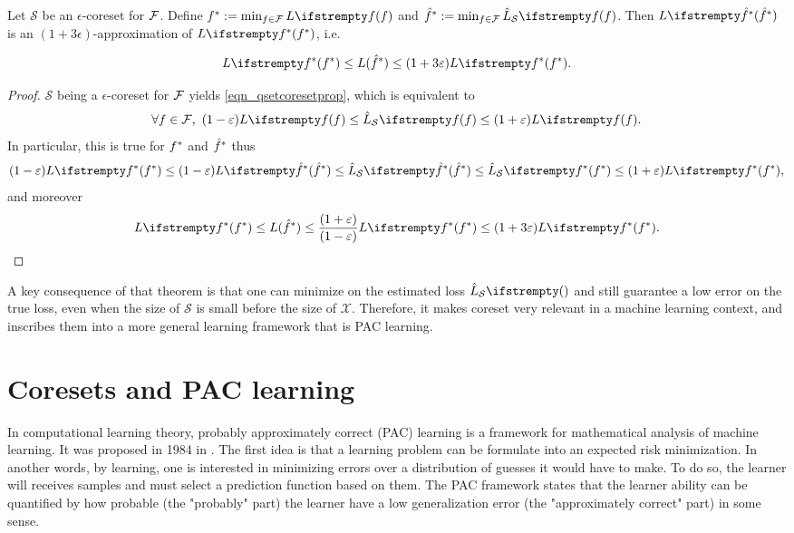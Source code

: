 \begin{tcolorbox}
    \begin{theorem}
        \label{thm_optcoreset}
        Let $\mathcal{S}$ be an $\epsilon$-coreset for $\mathcal{F}$. Define $\query^*:=\min_{\query \in \qset}\loss{\query}$ and $\hat \query^*:=\min_{\query \in \qset}\estloss{\mathcal{S}}{\query}$. Then $\loss{\hat\query^*} $ is an $(1+3\epsilon)$-approximation of $\loss{\query^*}$, i.e.
    
        \begin{equation*}
            \loss{\query^*} \le {L}( \hat\query^*)\leq (1+ 3 \epsilon)\loss{\query^*}.
        \end{equation*}
    \end{theorem}
\end{tcolorbox}
\begin{proof}
    $\mathcal{S}$ being a $\epsilon$-coreset for $\mathcal{F}$ yields \cref{eqn_qsetcoresetprop}, which is equivalent to 
    \begin{equation*}
        \forall \query \in \qset ,\ (1-\epsilon) \loss{\query} \le \estloss{\mathcal{S}}{\query} \le(1+\epsilon) \loss{\query}.
    \end{equation*}
    In particular, this is true for $f^*$ and $\hat {f}^*$ thus
    \begin{equation}
        (1-\epsilon) \loss{\query^*} \le(1-\epsilon) \loss{\hat\query^*} \le \estloss{\mathcal{S}}{\hat\query^*} \le \estloss{\mathcal{S}}{\query^*} \le(1+\epsilon) \loss{\query^*},
    \end{equation}
    and moreover
    \begin{equation*}
        \loss{\query^*} \le {L}( \hat\query^*) \le \frac{(1+\epsilon)}{(1-\epsilon) } \loss{\query^*} \leq (1+ 3 \epsilon)\loss{\query^*}.
        \end{equation*}
\end{proof}
A key consequence of that theorem is that one can minimize on the estimated loss $\estloss{\mathcal{S}}{}$ and still guarantee a low error on the true loss, even when the size of $\mathcal{S}$ is small before the size of $\mathcal{X}$. Therefore, it makes coreset very relevant in a machine learning context, and  inscribes them into a more general learning framework that is PAC learning.

\section{Coresets and PAC learning}
In computational learning theory, probably approximately correct (PAC) learning is a framework for mathematical analysis of machine learning. It was proposed in 1984 in \cite{valiant1984learnable}. The first idea is that a learning problem can be formulate into an expected risk minimization. In another words, by learning, one is interested in minimizing errors over a distribution of guesses it would have to make. To do so, the learner will receives samples and must select a prediction function based on them. The PAC framework states that the learner ability can be quantified by how probable (the "probably" part) the learner have a low generalization error (the "approximately correct" part) in some sense.



